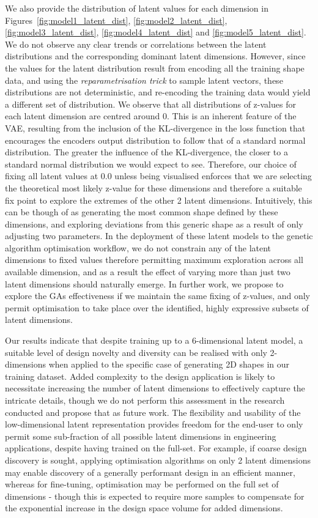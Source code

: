 \documentclass{article}
\begin{document}
We also provide the distribution of latent values for each dimension in Figures~\ref{fig:model1_latent_dist}, \ref{fig:model2_latent_dist}, \ref{fig:model3_latent_dist}, \ref{fig:model4_latent_dist} and \ref{fig:model5_latent_dist}. We do not observe any clear trends or correlations between the latent distributions and the corresponding dominant latent dimensions. However, since the values for the latent distribution result from encoding all the training shape data, and using the \textit{reparametrisation trick} to sample latent vectors, these distributions are not deterministic, and re-encoding the training data would yield a different set of distribution. We observe that all distributions of z-values for each latent dimension are centred around 0. This is an inherent feature of the VAE, resulting from the inclusion of the KL-divergence in the loss function that encourages the encoders output distribution to follow that of a standard normal distribution. The greater the influence of the KL-divergence, the closer to a standard normal distribution we would expect to see. Therefore, our choice of fixing all latent values at 0.0 unless being visualised enforces that we are selecting the theoretical most likely z-value for these dimensions and therefore a suitable fix point to explore the extremes of the other 2 latent dimensions. Intuitively, this can be though of as generating the most common shape defined by these dimensions, and exploring deviations from this generic shape as a result of only adjusting two parameters. In the deployment of these latent models to the genetic algorithm optimisation workflow, we do not constrain any of the latent dimensions to fixed values therefore permitting maximum exploration across all available dimension, and as a result the effect of varying more than just two latent dimensions should naturally emerge. In further work, we propose to explore the GAs effectiveness if we maintain the same fixing of z-values, and only permit optimisation to take place over the identified, highly expressive subsets of latent dimensions.

Our results indicate that despite training up to a 6-dimensional latent model, a suitable level of design novelty and diversity can be realised with only 2-dimensions when applied to the specific case of generating 2D shapes in our training dataset. Added complexity to the design application is likely to necessitate increasing the number of latent dimensions to effectively capture the intricate details, though we do not perform this assessment in the research conducted and propose that as future work. The flexibility and usability of the low-dimensional latent representation provides freedom for the end-user to only permit some sub-fraction of all possible latent dimensions in engineering applications, despite having trained on the full-set. For example, if coarse design discovery is sought, applying optimisation algorithms on only 2 latent dimensions may enable discovery of a generally performant design in an efficient manner, whereas for fine-tuning, optimisation may be performed on the full set of dimensions - though this is expected to require more samples to compensate for the exponential increase in the design space volume for added dimensions.
\end{document}
